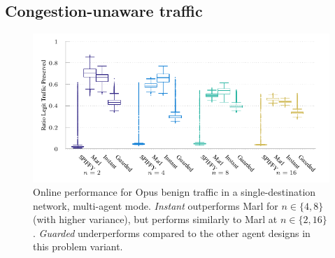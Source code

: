 \subsection{Congestion-unaware traffic}
%	
%	
\begin{figure}
	\centering
	\includegraphics[width=\linewidth]{plots/marl/tnsm-udp-box-separate}
	\caption[Online performance for Opus benign traffic in a single-destination network, multi-agent mode.]{
		Online performance for Opus benign traffic in a single-destination network, multi-agent mode.
		\emph{Instant} outperforms Marl for $n \in \{4, 8\}$ (with higher variance), but performs similarly to Marl at $n\in \{2, 16\}$.
		\emph{Guarded} underperforms compared to the other agent designs in this problem variant.
		\label{fig:udp-tree-box}
	}
\end{figure}

